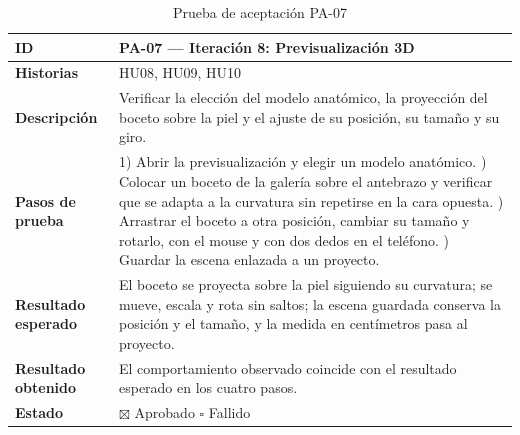 \documentclass[12pt,letterpaper,oneside]{report}
\begin{document}
\begin{table}[H]
  \centering
  \caption{Prueba de aceptación PA-07}
  \label{tab:pa07anexo}
  \renewcommand{\arraystretch}{1.3}
  \small
  \begin{tabular}{|>{\raggedright\arraybackslash}p{3.6cm}|p{9.4cm}|}
    \hline
    \textbf{ID} & PA-07 — Iteración 8: Previsualización 3D \\ \hline
    \textbf{Historias} & HU08, HU09, HU10 \\ \hline
    \textbf{Descripción} & Verificar la elección del modelo anatómico, la proyección del boceto sobre la piel y el ajuste de su posición, su tamaño y su giro. \\ \hline
    \textbf{Pasos de prueba} &
      1) Abrir la previsualización y elegir un modelo anatómico. \newline
      2) Colocar un boceto de la galería sobre el antebrazo y verificar que se adapta a la curvatura sin repetirse en la cara opuesta. \newline
      3) Arrastrar el boceto a otra posición, cambiar su tamaño y rotarlo, con el mouse y con dos dedos en el teléfono. \newline
      4) Guardar la escena enlazada a un proyecto. \\ \hline
    \textbf{Resultado esperado} & El boceto se proyecta sobre la piel siguiendo su curvatura; se mueve, escala y rota sin saltos; la escena guardada conserva la posición y el tamaño, y la medida en centímetros pasa al proyecto. \\ \hline
    \textbf{Resultado obtenido} & El comportamiento observado coincide con el resultado esperado en los cuatro pasos. \\ \hline
    \textbf{Estado} & $\boxtimes$ Aprobado \qquad $\square$ Fallido \\ \hline
  \end{tabular}
\end{table}
\end{document}
